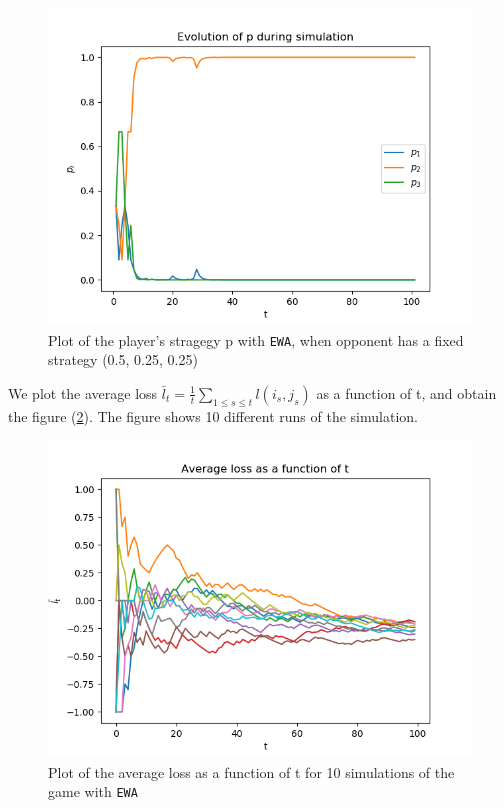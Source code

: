 \begin{figure}
	\includegraphics[width=\textwidth]{images/question3b}
	\caption{Plot of the player's stragegy p with \texttt{EWA}, when opponent has a fixed strategy (0.5, 0.25, 0.25)}
	\label{fig:question3b}
\end{figure}

 We plot the average loss $\bar{l}_t = \frac{1}{t} \sum_{1 \leqslant s \leqslant t} l(i_s, j_s)$ as a function of t, and obtain the figure (\ref{fig:question3c}). The figure shows 10 different runs of the simulation.  

\begin{figure}
	\includegraphics[width=\textwidth]{images/question3c}
	\caption{Plot of the average loss as a function of t for 10 simulations of the game with \texttt{EWA}}
	\label{fig:question3c}
\end{figure}

